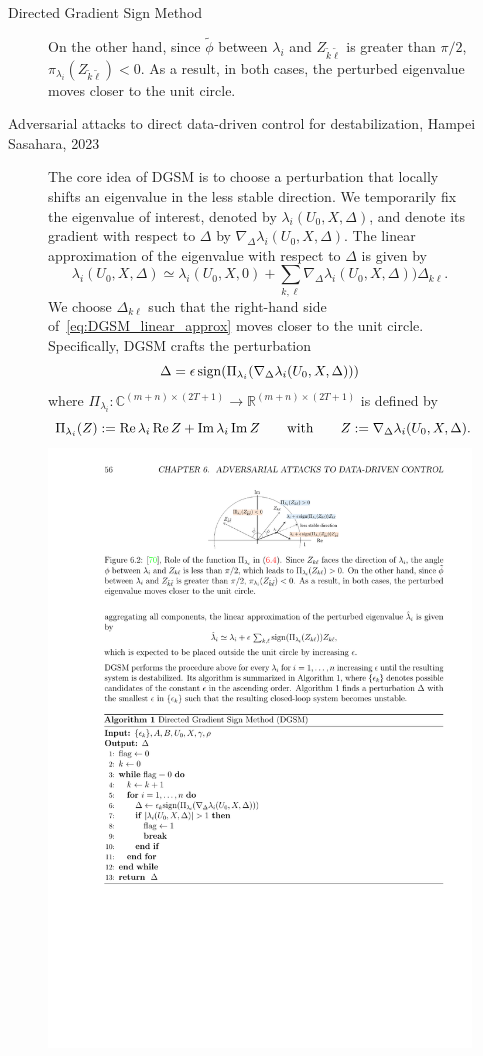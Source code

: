 \documentclass[aspectratio=169, handout, 10pt, hyperref=colorlinks]{beamer}
\begin{document}
\begin{frame}[allowframebreaks]{Directed Gradient Sign Method}
\begin{figure}[H]
{  On the other hand, since $\tilde{\phi}$ between $\lambda_i$ and $Z_{\tilde{k}\tilde{\ell}}$ is greater than $\pi/2$, $\pi_{\lambda_i}(Z_{\tilde{k}\tilde{\ell}})<0$.
  As a result, in both cases, the perturbed eigenvalue moves closer to the unit circle.}
\end{figure}
\begin{center}
    \tiny{Adversarial attacks to direct data-driven control for destabilization, Hampei Sasahara, 2023}
    \end{center}
\begin{figure}[H]
The core idea of DGSM is to choose a perturbation that locally shifts an eigenvalue in the less stable direction.
We temporarily fix the eigenvalue of interest, denoted by $\lambda_i(U_0,X,\Delta)$,
and denote its gradient with respect to $\Delta$ by $\nabla_{\Delta}\lambda_i(U_0,X,\Delta)$.
The linear approximation of the eigenvalue with respect to $\Delta$ is given by
\begin{equation}\label{eq:DGSM_linear_approx}
 \lambda_i(U_0,X,\Delta)\simeq \lambda_i(U_0,X,0)+\sum_{k,\ell} \nabla_{\Delta}\lambda_i(U_0,X,\Delta)) \Delta_{k\ell}.
\end{equation}
We choose $\Delta_{k \ell}$ such that the right-hand side of~\eqref{eq:DGSM_linear_approx} moves closer to the unit circle.
Specifically, DGSM crafts the perturbation
\[
 \Delta = \epsilon\, {\rm sign}(\Pi_{\lambda_i}(\nabla_{\Delta}\lambda_i(U_0,X,\Delta)))
\]
where $\Pi_{\lambda_i}:\mathbb{C}^{(m+n)\times(2T+1)}\to \mathbb{R}^{(m+n)\times(2T+1)}$ is defined by
\begin{equation}\label{eq:Pi}
 \Pi_{\lambda_i}(Z):= \operatorname{Re}{\lambda_i}\operatorname{Re}{Z}+\operatorname{Im}{\lambda_i}\operatorname{Im}{Z} \qquad\text{with}\qquad Z:=\nabla_{\Delta}\lambda_i(U_0,X,\Delta).
\end{equation}
\includegraphics[width=0.4\linewidth]{DGSM.pdf}

\end{figure}
\end{frame}
\end{document}
